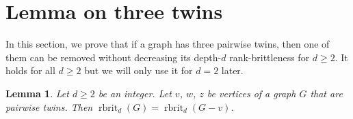 \documentclass[11pt]{article}
\newtheorem{lemma}[theorem]{Lemma}
\newcommand\rbrit{\operatorname{rbrit}}
\begin{document}
%
%
%
%
%
%
%
%
%
%
%
%
%
%
%
%
%
%
%
%
%
%
%
%
%
%
%
%
%
%
%
%
%
%
%
%
%
%
%
%
%
%
%
%
%
%
%
%
%
%
%
%
%
%
%
%
%
%




	\section{Lemma on three twins}\label{sec:rank1pair}
	
  In this section, we prove that if a graph has three pairwise twins, then one of them can be removed without decreasing its depth-$d$ rank-brittleness for $d\ge 2$.
  It holds for all $d\ge 2$ but we will only use it for $d=2$ later.
	
	\begin{lemma}\label{lem:reducetwin}
	Let $d\ge 2$ be an integer. 
        Let $v$, $w$, $z$ be vertices of a graph $G$ that are pairwise twins. 
	Then $\rbrit_d(G)=\rbrit_d(G-v)$.
	\end{lemma}
\end{document}
